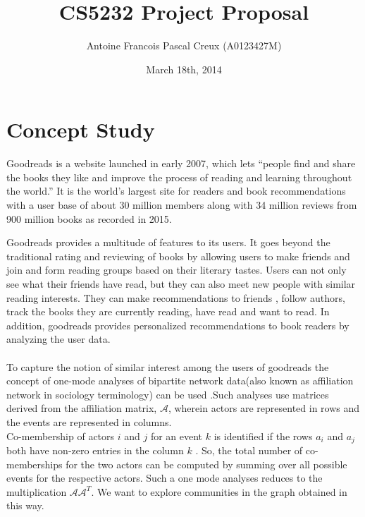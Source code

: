 \documentclass[12pt]{article}
\title{\textbf{CS5232 Project Proposal\\} }
\author{Antoine Francois Pascal Creux (A0123427M)}
\date{March 18th, 2014}
\begin{document}
\maketitle


\section{Concept Study}
Goodreads is a website launched in early 2007, which lets ``people find and share the books they like and improve the process of reading and learning throughout the world.'' It is the world’s largest site for readers and book recommendations with a user base of about  30 million members along with 34 million reviews from 900 million books as recorded in 2015\cite{goodreads:aboutus}.

Goodreads provides a multitude of features to its users. It goes beyond the traditional rating and reviewing of books by allowing users to make friends and join and form reading groups based on their literary tastes. Users can not only see what their friends have read, but they can also meet new people with similar reading interests. They can make recommendations to friends , follow authors, track the books they are currently reading, have read and want to read. In addition, goodreads provides personalized recommendations to book readers by analyzing the user data. \\\\

To capture the notion of similar interest among the users of goodreads  the concept of one-mode analyses of bipartite network data(also known as affiliation network in sociology terminology) can be used \cite{wasserman}.Such analyses use matrices derived from the affiliation matrix, $\mathcal{A}$, wherein actors are represented in rows and the events are represented in columns.\\

Co-membership of actors $i$ and $j$ for an event $k$ is identified if the rows $a_i$ and $a_j$ both have non-zero entries in the column $k$ . So, the total number of co-memberships for the two actors can be computed by summing over all possible events for the respective actors. Such a one mode analyses reduces to the multiplication $\mathcal{A}\mathcal{A}^{T}$. We want to explore communities in the graph obtained in this way.\\\\
\end{document}
